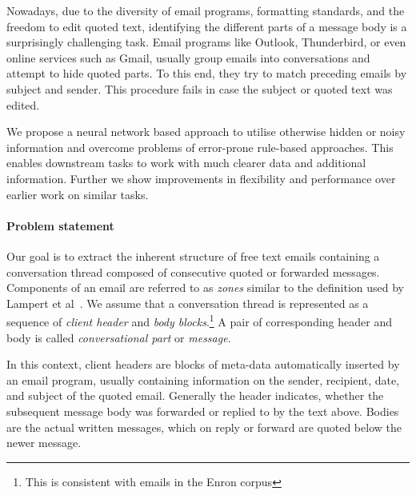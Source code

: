\documentclass{llncs}
\begin{document}
Nowadays, due to the diversity of email programs, formatting standards, and the freedom to edit quoted text, identifying the different parts of a message body is a surprisingly challenging task.
Email programs like Outlook, Thunderbird, or even online services such as Gmail, usually group emails into conversations and attempt to hide quoted parts.
To this end, they try to match preceding emails by subject and sender.
This procedure fails in case the subject or quoted text was edited.

We propose a neural network based approach to utilise otherwise hidden or noisy information and overcome problems of error-prone rule-based approaches.
This enables downstream tasks to work with much clearer data and additional information.
Further we show improvements in flexibility and performance over earlier work on similar tasks.






\paragraph{Problem statement}
Our goal is to extract the inherent structure of free text emails containing a conversation thread composed of consecutive quoted or forwarded messages.
Components of an email are referred to as \textit{zones} similar to the definition used by Lampert et al~\cite{zones}.
We assume that a conversation thread is represented as a sequence of \textit{client header} and \textit{body blocks}.\footnote{This is consistent with emails in the Enron corpus}
A pair of corresponding header and body is called \textit{conversational part} or \textit{message}.

In this context, client headers are blocks of meta-data automatically inserted by an email program, usually containing information on the sender, recipient, date, and subject of the quoted email.
Generally the header indicates, whether the subsequent message body was forwarded or replied to by the text above.
Bodies are the actual written messages, which on reply or forward are quoted below the newer message.
\end{document}
